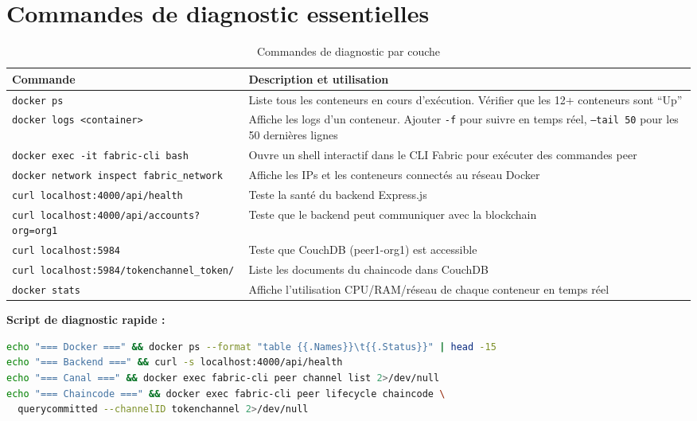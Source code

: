 \documentclass[12pt,a4paper,twoside]{report}
\begin{document}
\section{Commandes de diagnostic essentielles}

\begin{table}[H]
\centering
\begin{tabularx}{\textwidth}{lX}
\toprule
\textbf{Commande} & \textbf{Description et utilisation} \\
\midrule
\texttt{docker ps} & Liste tous les conteneurs en cours d'exécution. Vérifier que les 12+ conteneurs sont ``Up'' \\
\texttt{docker logs <container>} & Affiche les logs d'un conteneur. Ajouter \texttt{-f} pour suivre en temps réel, \texttt{--tail 50} pour les 50 dernières lignes \\
\texttt{docker exec -it fabric-cli bash} & Ouvre un shell interactif dans le CLI Fabric pour exécuter des commandes peer \\
\texttt{docker network inspect fabric\_network} & Affiche les IPs et les conteneurs connectés au réseau Docker \\
\texttt{curl localhost:4000/api/health} & Teste la santé du backend Express.js \\
\texttt{curl localhost:4000/api/accounts?org=org1} & Teste que le backend peut communiquer avec la blockchain \\
\texttt{curl localhost:5984} & Teste que CouchDB (peer1-org1) est accessible \\
\texttt{curl localhost:5984/tokenchannel\_token/} & Liste les documents du chaincode dans CouchDB \\
\texttt{docker stats} & Affiche l'utilisation CPU/RAM/réseau de chaque conteneur en temps réel \\
\bottomrule
\end{tabularx}
\caption{Commandes de diagnostic par couche}
\end{table}

\begin{tipbox}
\textbf{Script de diagnostic rapide :}
\begin{lstlisting}[language=bash, numbers=none]
echo "=== Docker ===" && docker ps --format "table {{.Names}}\t{{.Status}}" | head -15
echo "=== Backend ===" && curl -s localhost:4000/api/health
echo "=== Canal ===" && docker exec fabric-cli peer channel list 2>/dev/null
echo "=== Chaincode ===" && docker exec fabric-cli peer lifecycle chaincode \
  querycommitted --channelID tokenchannel 2>/dev/null
\end{lstlisting}
\end{tipbox}
\end{document}
